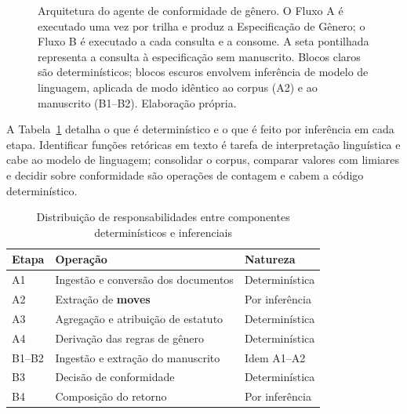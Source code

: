 \begin{figure}[H]
\caption{Arquitetura do agente de conformidade de gênero. O Fluxo A é executado uma vez por trilha e produz a Especificação de Gênero; o Fluxo B é executado a cada consulta e a consome. A seta pontilhada representa a consulta à especificação sem manuscrito. Blocos claros são determinísticos; blocos escuros envolvem inferência de modelo de linguagem, aplicada de modo idêntico ao corpus (A2) e ao manuscrito (B1--B2). Elaboração própria.}
\label{fig:arquitetura}
\end{figure}

A Tabela~\ref{tab:responsabilidades} detalha o que é determinístico e o que é feito por inferência em cada etapa. Identificar funções retóricas em texto é tarefa de interpretação linguística e cabe ao modelo de linguagem; consolidar o corpus, comparar valores com limiares e decidir sobre conformidade são operações de contagem e cabem a código determinístico.

\begin{table}[H]
\centering
\caption{Distribuição de responsabilidades entre componentes determinísticos e inferenciais}
\label{tab:responsabilidades}
\small
\begin{tabular}{|p{1.6cm}|p{7.6cm}|p{4.0cm}|}
\hline
\textbf{Etapa} & \textbf{Operação} & \textbf{Natureza} \\
\hline
A1 & Ingestão e conversão dos documentos & Determinística \\
\hline
A2 & Extração de \textbf{moves} & Por inferência \\
\hline
A3 & Agregação e atribuição de estatuto & Determinística \\
\hline
A4 & Derivação das regras de gênero & Determinística \\
\hline
B1--B2 & Ingestão e extração do manuscrito & Idem A1--A2 \\
\hline
B3 & Decisão de conformidade & Determinística \\
\hline
B4 & Composição do retorno & Por inferência \\
\hline
\end{tabular}
\end{table}

